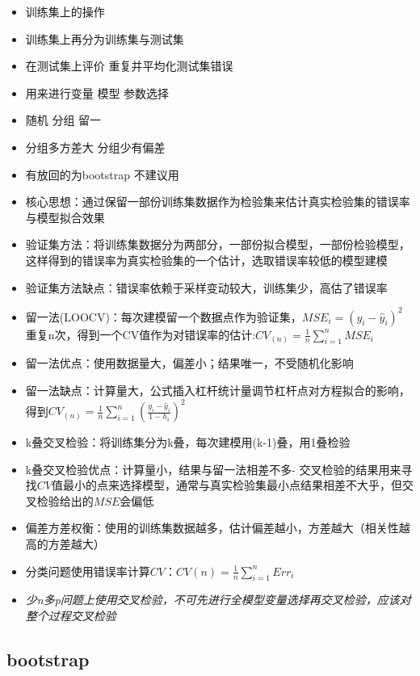 \documentclass[
]{book}
\begin{document}
\begin{itemize}
\item
  训练集上的操作
\item
  训练集上再分为训练集与测试集
\item
  在测试集上评价 重复并平均化测试集错误
\item
  用来进行变量 模型 参数选择
\item
  随机 分组 留一
\item
  分组多方差大 分组少有偏差
\item
  有放回的为bootstrap 不建议用
\item
  核心思想：通过保留一部份训练集数据作为检验集来估计真实检验集的错误率与模型拟合效果
\item
  验证集方法：将训练集数据分为两部分，一部份拟合模型，一部份检验模型，这样得到的错误率为真实检验集的一个估计，选取错误率较低的模型建模
\item
  验证集方法缺点：错误率依赖于采样变动较大，训练集少，高估了错误率
\item
  留一法(LOOCV)：每次建模留一个数据点作为验证集，\(MSE_i = (y_i - \hat y_i)^2\)重复n次，得到一个CV值作为对错误率的估计:\(CV_{(n)} = \frac{1}{n} \sum_{i = 1}^{n} MSE_i\)
\item
  留一法优点：使用数据量大，偏差小；结果唯一，不受随机化影响
\item
  留一法缺点：计算量大，公式插入杠杆统计量调节杠杆点对方程拟合的影响，得到\(CV_{(n)} = \frac{1}{n} \sum_{i = 1}^{n} (\frac{y_i - \hat y_i}{1 - h_i})^2\)
\item
  k叠交叉检验：将训练集分为k叠，每次建模用(k-1)叠，用1叠检验
\item
  k叠交叉检验优点：计算量小，结果与留一法相差不多- 交叉检验的结果用来寻找\(CV\)值最小的点来选择模型，通常与真实检验集最小点结果相差不大乎，但交叉检验给出的\(MSE\)会偏低
\item
  偏差方差权衡：使用的训练集数据越多，估计偏差越小，方差越大（相关性越高的方差越大）
\item
  分类问题使用错误率计算\(CV\)：\(CV{(n)} = \frac{1}{n} \sum_{i = 1}^{n} Err_{i}\)
\item
  \emph{少n多p问题上使用交叉检验，不可先进行全模型变量选择再交叉检验，应该对整个过程交叉检验}
\end{itemize}

\hypertarget{bootstrap}{%
\subsection{bootstrap}\label{bootstrap}}
\end{document}
